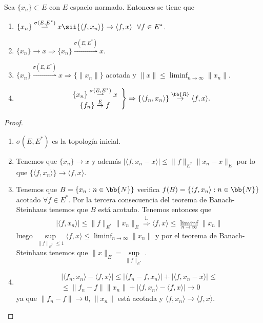 \begin{prop}
    Sea $\{x_n\}\subset E$ con $E$ espacio normado. Entonces se tiene que 
    \begin{enumerate}
        \item $\{x_n\} \overset{\sigma(E, E^*)}{\rightharpoonup} x \sii \{\langle f,x_n \rangle \} \to \langle f,x\rangle \ \ \forall f \in E^*$.
        \item $\{x_n\} \to x \Rightarrow \{x_n\} \overset{\sigma(E,E^*)}{\rightharpoonup} x$.
        \item $\{x_n\} \overset{\sigma(E,E^*)}{\rightharpoonup} x \Rightarrow \{\|x_n\|\}$ acotada y $\|x\| \leq \liminf_{n\to\infty} \|x_n\|$.
        \item \begin{gather*}
            \left.
                \begin{array}{c}
                    \{x_n\} \overset{\sigma(E, E^*)}{\rightharpoonup} x\\
                    \{f_n\} \overset{E}{\to} f
                \end{array}
            \right\} \Rightarrow \{\langle f_n, x_n \rangle\} \overset{\bb{R}}{\to} \langle f,x \rangle.
        \end{gather*} 
    \end{enumerate}
    \begin{proof}\
        \begin{enumerate}
            \item $\sigma(E,E^*)$ es la topología inicial.
            \item Tenemos que $\{x_n\}\to x$ y además $|\langle f,x_n-x\rangle | \leq \|f\|_{E^*} \|x_n-x\|_{E}$ por lo que $\{\langle f,x_n \rangle\} \to \langle f,x \rangle$.
            \item Tenemos que $B=\{x_n : n\in \bb{N}\}$ verifica $f(B)=\{\langle f,x_n \rangle : n\in \bb{N}\}$ acotado $\forall f \in E^*$. Por la tercera consecuencia del teorema de Banach-Steinhaus tenemos que $B$ está acotado. Tenemos entonces que
            \begin{gather*}
                |\langle f,x_n \rangle| \leq \|f\|_{E^*} \|x_n\|_E \overset{1.}{\Longrightarrow} \langle f,x \rangle \leq \liminf_{n\to\infty} \|x_n\|
            \end{gather*}
            luego $\sup\limits_{\|f\|_{E^*}\leq 1} \langle f,x \rangle \leq \liminf_{n\to\infty} \|x_n\|$ y por el teorema de Banach-Steinhaus tenemos que $\|x\|_E = \sup\limits_{\|f\|_{E^*}}$.

            \item \begin{gather*}
                |\langle f_n,x_n\rangle  - \langle f,x \rangle | \leq | \langle f_n-f, x_n \rangle| + |\langle f,x_n-x\rangle| \leq \\
                \leq \|f_n-f\| \|x_n\| + |\langle f,x_n\rangle - \langle f,x \rangle | \to 0
            \end{gather*}
            ya que $\|f_n-f\| \to 0$, $\|x_n\|$ está acotada y $\langle f,x_n\rangle \to \langle f,x \rangle$.
        \end{enumerate}
    \end{proof}
\end{prop}

